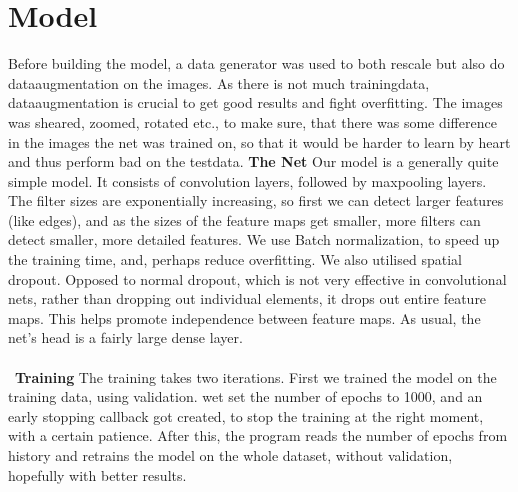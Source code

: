 \section{Model}

Before building the model, a data generator was used to both rescale but also do dataaugmentation on the images. As there is not much trainingdata, dataaugmentation is crucial to get good results and fight overfitting. The images was sheared, zoomed, rotated etc., to make sure, that there was some difference in the images the net was trained on, so that it would be harder to learn by heart and thus perform bad on the testdata.  
\newline
\newline
\textbf{The Net}
\newline
Our model is a generally quite simple model. It consists of convolution layers, followed by maxpooling layers. The filter sizes are exponentially increasing, so first we can detect larger features (like edges), and as the sizes of the feature maps get smaller, more filters can detect smaller, more detailed features. We use Batch normalization, to speed up the training time, and, perhaps reduce overfitting. We also utilised spatial dropout. Opposed to normal dropout, which is not very effective in convolutional nets, rather than dropping out individual elements, it drops out entire feature maps. This helps promote independence between feature maps. As usual, the net’s head is a fairly large dense layer.
\\\
\\\
\textbf{Training}
\newline
The training takes two iterations. First we trained the model on the training data, using validation. wet set the number of epochs to 1000, and an early stopping callback got created, to stop the training at the right moment, with a certain patience. After this, the program reads the number of epochs from history and retrains the model on the whole dataset, without validation, hopefully with better results.